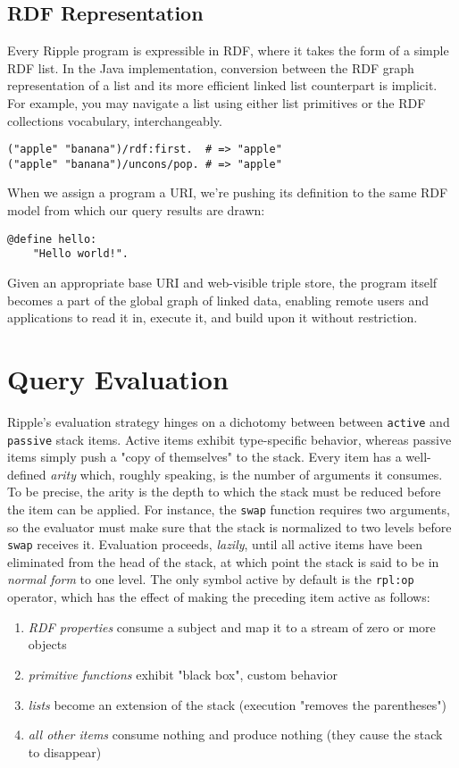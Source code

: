 \documentclass[runningheads]{llncs}
\begin{document}
\subsection{RDF Representation}
Every Ripple program is expressible in RDF, where it takes the form of a simple RDF list.  In the Java implementation, conversion between the RDF graph representation of a list and its more efficient linked list counterpart is implicit.  For example, you may navigate a list using either list primitives or the RDF collections vocabulary, interchangeably.
\begin{verbatim}
("apple" "banana")/rdf:first.  # => "apple"
("apple" "banana")/uncons/pop. # => "apple"
\end{verbatim}

When we assign a program a URI, we're pushing its definition to the same RDF model from which our query results are drawn:
\begin{verbatim}
@define hello:
    "Hello world!".
\end{verbatim}

Given an appropriate base URI and web-visible triple store, the program itself becomes a part of the global graph of linked data, enabling remote users and applications to read it in, execute it, and build upon it without restriction.


\section{Query Evaluation}

Ripple's evaluation strategy hinges on a dichotomy between between \texttt{active} and \texttt{passive} stack items.  Active items exhibit type-specific behavior, whereas passive items simply push a "copy of themselves" to the stack.  Every item has a well-defined \textit{arity} which, roughly speaking, is the number of arguments it consumes.  To be precise, the arity is the depth to which the stack must be reduced before the item can be applied.  For instance, the \texttt{swap} function requires two arguments, so the evaluator must make sure that the stack is normalized to two levels before \texttt{swap} receives it.  Evaluation proceeds, \textit{lazily}, until all active items have been eliminated from the head of the stack, at which point the stack is said to be in \textit{normal form} to one level.  The only symbol active by default is the \texttt{rpl:op} operator, which has the effect of making the preceding item active as follows:
\begin{enumerate}
\item \textit{RDF properties} consume a subject and map it to a stream of zero or more objects
\item \textit{primitive functions} exhibit "black box", custom behavior
\item \textit{lists} become an extension of the stack (execution "removes the parentheses")
\item \textit{all other items} consume nothing and produce nothing (they cause the stack to disappear)
\end{enumerate}
\end{document}
